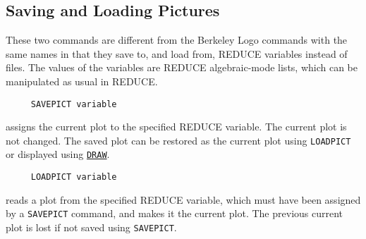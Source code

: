 






\subsection{Saving and Loading Pictures}
\label{logoturtle:SLP}

These two commands are different from the Berkeley Logo commands with
the same names in that they save to, and load from, REDUCE variables
instead of files.  The values of the variables are REDUCE
algebraic-mode lists, which can be manipulated as usual in REDUCE.

\begin{verbatim}
     SAVEPICT variable
\end{verbatim}
\label{logoturtle:savepict}
assigns the current plot to the specified REDUCE variable.  The
current plot is not changed.  The saved plot can be restored as the
current plot using \texttt{LOADPICT} or displayed using
\hyperref[logoturtle:draw]{\texttt{DRAW}}.

\begin{verbatim}
     LOADPICT variable
\end{verbatim}
reads a plot from the specified REDUCE variable, which must have been
assigned by a \texttt{SAVEPICT} command, and makes it the current
plot.  The previous current plot is lost if not saved using
\texttt{SAVEPICT}.
